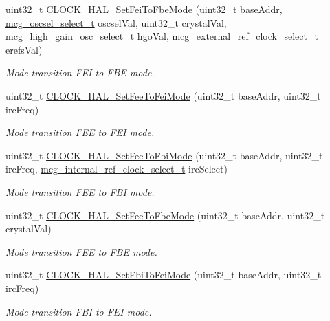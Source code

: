 \begin{DoxyCompactItemize}
uint32\+\_\+t \hyperlink{group__mcg__hal_ga9a16216547102bc715286fc32fd4fdc2}{C\+L\+O\+C\+K\+\_\+\+H\+A\+L\+\_\+\+Set\+Fei\+To\+Fbe\+Mode} (uint32\+\_\+t base\+Addr, \hyperlink{group__mcg__hal_ga199389ca614bebd5d3a6a32b1d5c558c}{mcg\+\_\+oscsel\+\_\+select\+\_\+t} oscsel\+Val, uint32\+\_\+t crystal\+Val, \hyperlink{group__mcg__hal_ga7218a02fa6a0189cb9b1e4e521bd682b}{mcg\+\_\+high\+\_\+gain\+\_\+osc\+\_\+select\+\_\+t} hgo\+Val, \hyperlink{group__mcg__hal_ga9644a6c2e01b6262770ade769051224d}{mcg\+\_\+external\+\_\+ref\+\_\+clock\+\_\+select\+\_\+t} erefs\+Val)
\begin{DoxyCompactList}\small\item\em Mode transition F\+EI to F\+BE mode. \end{DoxyCompactList}\item 
uint32\+\_\+t \hyperlink{group__mcg__hal_gaebfd0fef579176ee8e4d1eb632d3a4ab}{C\+L\+O\+C\+K\+\_\+\+H\+A\+L\+\_\+\+Set\+Fee\+To\+Fei\+Mode} (uint32\+\_\+t base\+Addr, uint32\+\_\+t irc\+Freq)
\begin{DoxyCompactList}\small\item\em Mode transition F\+EE to F\+EI mode. \end{DoxyCompactList}\item 
uint32\+\_\+t \hyperlink{group__mcg__hal_ga3b097874025e69cb3c4e69a1d5021af8}{C\+L\+O\+C\+K\+\_\+\+H\+A\+L\+\_\+\+Set\+Fee\+To\+Fbi\+Mode} (uint32\+\_\+t base\+Addr, uint32\+\_\+t irc\+Freq, \hyperlink{group__mcg__hal_ga9738d5cb312dacd7c75d2ed599ad48c7}{mcg\+\_\+internal\+\_\+ref\+\_\+clock\+\_\+select\+\_\+t} irc\+Select)
\begin{DoxyCompactList}\small\item\em Mode transition F\+EE to F\+BI mode. \end{DoxyCompactList}\item 
uint32\+\_\+t \hyperlink{group__mcg__hal_ga18631d2906af6c46f217da3176947915}{C\+L\+O\+C\+K\+\_\+\+H\+A\+L\+\_\+\+Set\+Fee\+To\+Fbe\+Mode} (uint32\+\_\+t base\+Addr, uint32\+\_\+t crystal\+Val)
\begin{DoxyCompactList}\small\item\em Mode transition F\+EE to F\+BE mode. \end{DoxyCompactList}\item 
uint32\+\_\+t \hyperlink{group__mcg__hal_gad99c7af64a31b032fdda5f0c4352d09e}{C\+L\+O\+C\+K\+\_\+\+H\+A\+L\+\_\+\+Set\+Fbi\+To\+Fei\+Mode} (uint32\+\_\+t base\+Addr, uint32\+\_\+t irc\+Freq)
\begin{DoxyCompactList}\small\item\em Mode transition F\+BI to F\+EI mode. \end{DoxyCompactList}\item 

\end{DoxyCompactItemize}
